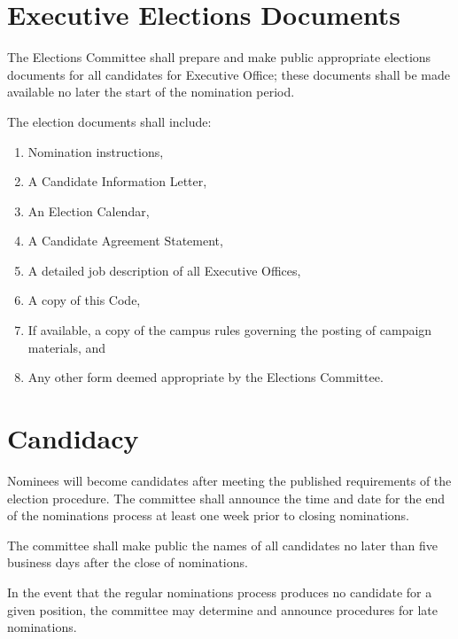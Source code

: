 \section{Executive Elections Documents}
\begin{bylaws-number}
  \item The Elections Committee shall prepare and make public appropriate elections documents for all candidates for Executive Office; these documents shall be made available no later the start of the nomination period.
  \item The election documents shall include:
  \begin{enumerate}
    \item Nomination instructions,
    \item A Candidate Information Letter,
    \item An Election Calendar,
    \item A Candidate Agreement Statement,
    \item A detailed job description of all Executive Offices,
    \item A copy of this Code, 
    \item If available, a copy of the campus rules governing the posting of campaign materials, and
    \item Any other form deemed appropriate by the Elections Committee.
  \end{enumerate}
\end{bylaws-number}

\section{Candidacy}
\begin{bylaws-number}
  \item Nominees will become candidates after meeting the published requirements of the election procedure. The committee shall announce the time and date for the end of the nominations process at least one week prior to closing nominations.
  \item The committee shall make public the names of all candidates no later than five business days after the close of nominations.
  \item In the event that the regular nominations process produces no candidate for a given position, the committee may determine and announce procedures for late nominations.
\end{bylaws-number}

